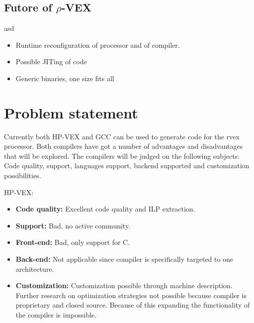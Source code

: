\subsection{Futore of $\rho$-VEX}
asd
\begin{itemize}
	\item Runtime reconfiguration of processor and of compiler.
	\item Possible JITing of code
	\item Generic binaries, one size fits all
\end{itemize}
\section{Problem statement}
Currently both HP-VEX and GCC can be used to generate code for the rvex processor. Both compilers have got a number of advantages and disadvantages that will be explored. The compilers will be judged on the following subjects: Code quality, support, languages support, backend supported and customization possibilities.

HP-VEX:
\begin{itemize}
	\item \textbf{Code quality:} Excellent code quality and ILP extraction.
	\item \textbf{Support:} Bad, no active community.
	\item \textbf{Front-end:} Bad, only support for C.
	\item \textbf{Back-end:} Not applicable since compiler is specifically targeted to one architecture.
	\item \textbf{Customization:} Customization possible through machine description. Further research on optimization strategies not possible because compiler is proprietary and closed source. Because of this expanding the functionality of the compiler is impossible.
\end{itemize}

